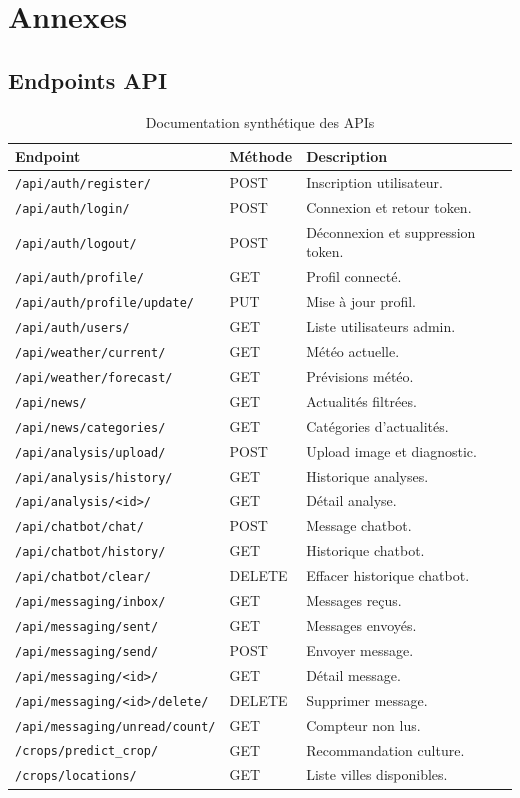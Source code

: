 \appendix
\chapter{Annexes}

\section{Endpoints API}
\begin{longtable}{p{5cm}p{2cm}p{7cm}}
\caption{Documentation synthétique des APIs}\\
\toprule
\textbf{Endpoint} & \textbf{Méthode} & \textbf{Description} \\
\midrule
\texttt{/api/auth/register/} & POST & Inscription utilisateur. \\
\texttt{/api/auth/login/} & POST & Connexion et retour token. \\
\texttt{/api/auth/logout/} & POST & Déconnexion et suppression token. \\
\texttt{/api/auth/profile/} & GET & Profil connecté. \\
\texttt{/api/auth/profile/update/} & PUT & Mise à jour profil. \\
\texttt{/api/auth/users/} & GET & Liste utilisateurs admin. \\
\texttt{/api/weather/current/} & GET & Météo actuelle. \\
\texttt{/api/weather/forecast/} & GET & Prévisions météo. \\
\texttt{/api/news/} & GET & Actualités filtrées. \\
\texttt{/api/news/categories/} & GET & Catégories d'actualités. \\
\texttt{/api/analysis/upload/} & POST & Upload image et diagnostic. \\
\texttt{/api/analysis/history/} & GET & Historique analyses. \\
\texttt{/api/analysis/<id>/} & GET & Détail analyse. \\
\texttt{/api/chatbot/chat/} & POST & Message chatbot. \\
\texttt{/api/chatbot/history/} & GET & Historique chatbot. \\
\texttt{/api/chatbot/clear/} & DELETE & Effacer historique chatbot. \\
\texttt{/api/messaging/inbox/} & GET & Messages reçus. \\
\texttt{/api/messaging/sent/} & GET & Messages envoyés. \\
\texttt{/api/messaging/send/} & POST & Envoyer message. \\
\texttt{/api/messaging/<id>/} & GET & Détail message. \\
\texttt{/api/messaging/<id>/delete/} & DELETE & Supprimer message. \\
\texttt{/api/messaging/unread/count/} & GET & Compteur non lus. \\
\texttt{/crops/predict\_crop/} & GET & Recommandation culture. \\
\texttt{/crops/locations/} & GET & Liste villes disponibles. \\
\bottomrule
\end{longtable}

